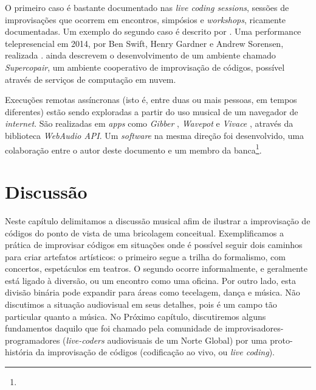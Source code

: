 O primeiro caso é bastante documentado nas \emph{live coding sessions}, sessões de improvisações que ocorrem em encontros, simpósios e \emph{workshops}, ricamente documentadas. Um exemplo do segundo caso é descrito por . Uma performance telepresencial em 2014, por Ben Swift, Henry Gardner e Andrew Sorensen, realizada .  ainda descrevem o desenvolvimento de um ambiente chamado \emph{Supercopair}, um ambiente cooperativo de improvisação de códigos, possível através de serviços de computação em nuvem.    

Execuções remotas assíncronas (isto é, entre duas ou mais pessoas, em tempos diferentes) estão sendo exploradas a partir do uso musical de um navegador de \emph{internet}. São realizadas em \emph{apps} como \emph{Gibber} \cite{roberts_gibber:_2012}, \emph{Wavepot} e \emph{Vivace} \cite{vieira_vivace:_2015}, através da biblioteca \emph{WebAudio API}. Um \emph{software} na mesma direção foi desenvolvido, uma colaboração entre o autor deste documento e um membro da banca\footnote{}.  



\section{Discussão}

Neste capítulo delimitamos a discussão musical afim de ilustrar a improvisação de códigos do ponto de vista de uma bricolagem conceitual. Exemplificamos a prática de improvisar códigos em situações onde é possível seguir dois caminhos para criar artefatos artísticos: o primeiro segue a trilha do formalismo, com concertos, espetáculos em teatros. O segundo ocorre informalmente, e geralmente está ligado à diversão, ou um encontro como uma oficina. Por outro lado, esta divisão binária pode expandir para áreas como tecelagem, dança e música. Não discutimos a situação audiovisual em seus detalhes, pois é um campo tão particular quanto a música. No Próximo capítulo, discutiremos alguns fundamentos daquilo que foi chamado pela comunidade de improvisadores-programadores (\emph{live-coders} audiovisuais de um Norte Global) por uma proto-história da improvisação de códigos (codificação ao vivo, ou \emph{live coding}). 
